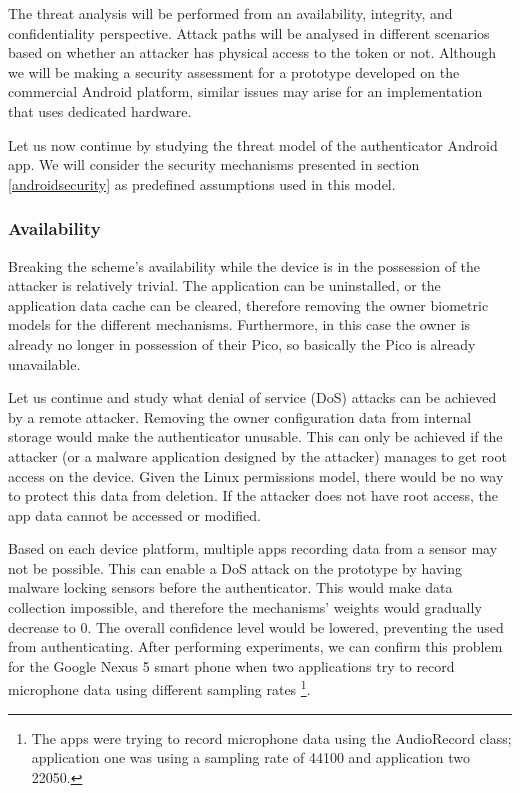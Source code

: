 The threat analysis will be performed from an availability, integrity, and confidentiality perspective. Attack paths will be analysed in different scenarios based on whether an attacker has physical access to the token or not. Although we will be making a security assessment for a prototype developed on the commercial Android platform, similar issues may arise for an implementation that uses dedicated hardware.

Let us now continue by studying the threat model of the authenticator Android app. We will consider the security mechanisms presented in section \ref{androidsecurity} as predefined assumptions used in this model.

\subsubsection*{Availability}
Breaking the scheme's availability while the device is in the possession of the attacker is relatively trivial. The application can be uninstalled, or the application data cache can be cleared, therefore removing the owner biometric models for the different mechanisms. Furthermore, in this case the owner is already no longer in possession of their Pico, so basically the Pico is already unavailable.

Let us continue and study what denial of service (DoS) attacks can be achieved by a remote attacker. Removing the owner configuration data from internal storage would make the authenticator unusable. This can only be achieved if the attacker (or a malware application designed by the attacker) manages to get root access on the device. Given the Linux permissions model, there would be no way to protect this data from deletion. If the attacker does not have root access, the app data cannot be accessed or modified.

Based on each device platform, multiple apps recording data from a sensor may not be possible. This can enable a DoS attack on the prototype by having malware locking sensors before the authenticator. This would make data collection impossible, and therefore the mechanisms' weights would gradually decrease to 0. The overall confidence level would be lowered, preventing the used from authenticating. After performing experiments, we can confirm this problem for the Google Nexus 5 smart phone when two applications try to record microphone data using different sampling rates \footnote{The apps were trying to record microphone data using the AudioRecord class; application one was using a sampling rate of 44100 and application two 22050.}.

